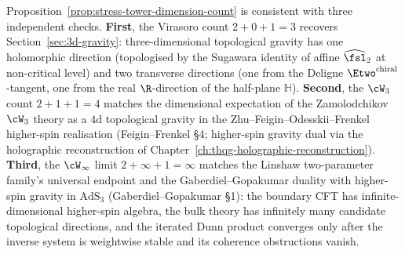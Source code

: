 \begin{remark}
\label{rem:stress-tower-consistency-checks}
Proposition~\ref{prop:stress-tower-dimension-count} is consistent with
three independent checks. \textbf{First}, the Virasoro count
$2 + 0 + 1 = 3$ recovers Section~\ref{sec:3d-gravity}:
three-dimensional topological gravity has one holomorphic direction
(topologised by the Sugawara identity of affine $\widehat{\fsl}_2$ at
non-critical level) and two transverse directions (one from the Deligne
$\Etwo^{\mathrm{chiral}}$-tangent, one from the real $\R$-direction of
the half-plane $\mathbb{H}$). \textbf{Second}, the $\cW_3$ count
$2 + 1 + 1 = 4$ matches the dimensional expectation of the
Zamolodchikov $\cW_3$ theory as a $4$d topological gravity in the
Zhu--Feigin--Odesskii--Frenkel higher-spin realisation
(Feigin--Frenkel\,\cite{Feigin-Frenkel-screenings}\,§4; higher-spin gravity
dual via the holographic reconstruction of Chapter~\ref{ch:thqg-holographic-reconstruction}).
\textbf{Third}, the $\cW_\infty$ limit $2 + \infty + 1 = \infty$
matches the Linshaw two-parameter family's universal endpoint and the
Gaberdiel--Gopakumar duality with higher-spin gravity in $\mathrm{AdS}_3$
(Gaberdiel--Gopakumar\,\cite{GaberdielGopakumar2011-Winfty}\,§1): the
boundary CFT has infinite-dimensional higher-spin algebra, the bulk
theory has infinitely many candidate topological directions, and the
iterated Dunn product converges only after the inverse system is
weightwise stable and its coherence obstructions vanish.
\end{remark}

